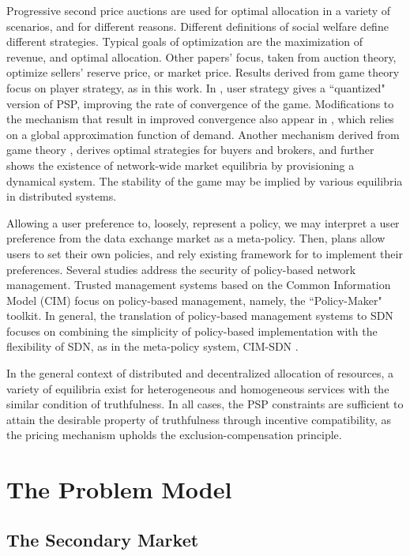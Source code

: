 Progressive second price auctions are used for optimal allocation in a
variety of scenarios, and for different reasons. Different definitions of social
welfare define different strategies. Typical goals of optimization are the
maximization of revenue, and optimal allocation. Other papers' focus, taken from
auction theory, optimize sellers' reserve price, or market price. Results derived from game theory
focus on player strategy, as in this work. In \cite{qpsp}, user strategy gives a ``quantized"
version of PSP, improving the rate of convergence of the game. Modifications to
the mechanism that result in improved convergence also appear in \cite{burst},
which relies on a global approximation function of demand.
Another mechanism derived from game theory \cite{diffserve}, derives
optimal strategies for buyers and brokers, and further shows the existence
of network-wide market equilibria by provisioning a dynamical system. The stability
of the game may be implied by various equilibria in distributed systems.

Allowing a user preference to, loosely, represent a policy, we may interpret
a user preference from the data exchange market as a meta-policy. Then,  plans allow users to set their own policies, and rely existing
framework for to implement their preferences. Several studies address the
security of policy-based network management.
Trusted management systems based on the
Common Information Model (CIM) focus on policy-based management, namely,
the ``Policy-Maker" toolkit. 
In general, the translation of policy-based management systems to SDN focuses on combining
the simplicity of policy-based implementation with the flexibility of SDN, as in the
meta-policy system, CIM-SDN \cite{meta}.

In the general context of distributed and decentralized allocation of
resources, a variety of equilibria exist for heterogeneous and homogeneous services
with the similar condition of truthfulness. In all cases, the PSP constraints are
sufficient to attain the desirable property of truthfulness through incentive
compatibility, as the pricing mechanism upholds the exclusion-compensation
principle.

\section{The Problem Model}

\subsection{The Secondary Market}

